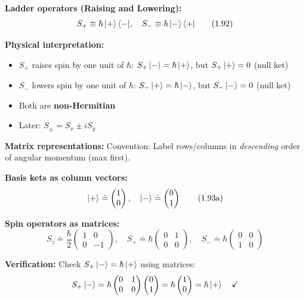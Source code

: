\documentclass[11pt,a4paper]{article}
\begin{document}
\textbf{Ladder operators (Raising and Lowering):}
\begin{equation}
S_+ \equiv \hbar\ket{+}\langle -|, \quad S_- \equiv \hbar\ket{-}\langle +|
\tag{1.92}
\end{equation}

\textbf{Physical interpretation:}
\begin{itemize}
\item $S_+$ raises spin by one unit of $\hbar$: $S_+\ket{-} = \hbar\ket{+}$, but $S_+\ket{+} = 0$ (null ket)
\item $S_-$ lowers spin by one unit of $\hbar$: $S_-\ket{+} = \hbar\ket{-}$, but $S_-\ket{-} = 0$ (null ket)
\item Both are \textbf{non-Hermitian}
\item Later: $S_\pm = S_x \pm iS_y$
\end{itemize}

\textbf{Matrix representations:}
Convention: Label rows/columns in \textit{descending} order of angular momentum (max first).

\textbf{Basis kets as column vectors:}
\begin{equation}
\ket{+} \doteq \begin{pmatrix} 1 \\ 0 \end{pmatrix}, \quad \ket{-} \doteq \begin{pmatrix} 0 \\ 1 \end{pmatrix}
\tag{1.93a}
\end{equation}

\textbf{Spin operators as matrices:}
\begin{equation}
S_z \doteq \frac{\hbar}{2}\begin{pmatrix} 1 & 0 \\ 0 & -1 \end{pmatrix}, \quad 
S_+ \doteq \hbar\begin{pmatrix} 0 & 1 \\ 0 & 0 \end{pmatrix}, \quad 
S_- \doteq \hbar\begin{pmatrix} 0 & 0 \\ 1 & 0 \end{pmatrix}
\tag{1.93b}
\end{equation}

\textbf{Verification:} Check $S_+\ket{-} = \hbar\ket{+}$ using matrices:
$$S_+\ket{-} = \hbar\begin{pmatrix} 0 & 1 \\ 0 & 0 \end{pmatrix}\begin{pmatrix} 0 \\ 1 \end{pmatrix} = \hbar\begin{pmatrix} 1 \\ 0 \end{pmatrix} = \hbar\ket{+} \quad \checkmark$$
\newpage
\end{document}

